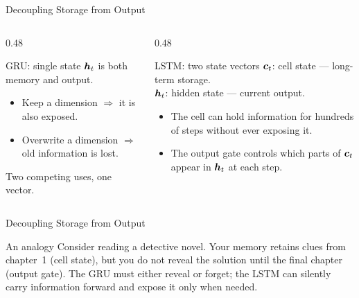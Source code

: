 \documentclass[aspectratio=169]{beamer}
\begin{document}
\begin{frame}{Decoupling Storage from Output}

\begin{columns}[T]
\begin{column}{0.48\textwidth}

\begin{block}{GRU: single state}
$\bm{h}_t$ is both memory and output.

\medskip
\begin{itemize}
\item Keep a dimension $\Rightarrow$ it is also exposed.
\item Overwrite a dimension $\Rightarrow$ old information is lost.
\end{itemize}

\medskip
Two competing uses, one vector.
\end{block}

\end{column}
\begin{column}{0.48\textwidth}

\begin{block}{LSTM: two state vectors}
$\bm{c}_t$: cell state --- long-term storage.\\
$\bm{h}_t$: hidden state --- current output.

\medskip
\begin{itemize}
\item The cell can hold information for hundreds of
      steps without ever exposing it.
\item The output gate controls which parts of
      $\bm{c}_t$ appear in $\bm{h}_t$ at each step.
\end{itemize}
\end{block}

\end{column}
\end{columns}
\end{frame}
%
%
\begin{frame}{Decoupling Storage from Output}

\begin{alertblock}{An analogy}
Consider reading a detective novel.  Your memory retains clues from
chapter~1 (cell state), but you do not reveal the solution until the
final chapter (output gate).  The GRU must either reveal or forget;
the LSTM can silently carry information forward and expose it only
when needed.
\end{alertblock}

\end{frame}
\end{document}
